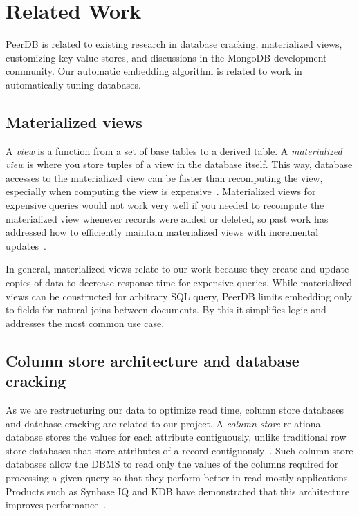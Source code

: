 \section{Related Work}

PeerDB is related to existing research in database cracking, materialized views, customizing key value stores, and discussions in the MongoDB development community. Our automatic embedding algorithm is related to work in automatically tuning databases.

\subsection{Materialized views}

A {\em view} is a function from a set of base tables to a derived table.
A {\em materialized view} is where you store tuples of a view in the database itself.
This way, database accesses to the materialized view can be faster than recomputing the view, especially when computing the view is expensive~\cite{Gupta1995}.
Materialized views for expensive queries would not work very well if you needed to recompute the materialized view whenever records were added or deleted, so past work has addressed how to efficiently maintain materialized views with incremental updates~\cite{Larson1985,Blakeley1986,Gupta1995,Zhou2007,Zhou2007a}.

In general, materialized views relate to our work because they create and update copies of data to decrease response time for expensive queries.
While materialized views can be constructed for arbitrary SQL query, PeerDB limits embedding only to fields for natural joins between documents.
By this it simplifies logic and addresses the most common use case.

\subsection{Column store architecture and database cracking}

As we are restructuring our data to optimize read time, column store databases and database cracking are related to our project.
A {\em column store} relational database stores the values for each attribute contiguously, unlike traditional row store databases that store attributes of a record contiguously~\cite{Stonebraker}.
Such column store databases allow the DBMS to read only the values of the columns required for processing a given query so that they perform better in read-mostly applications.
Products such as Synbase IQ and KDB have demonstrated that this architecture improves performance~\cite{Stonebraker,French1995}. 


